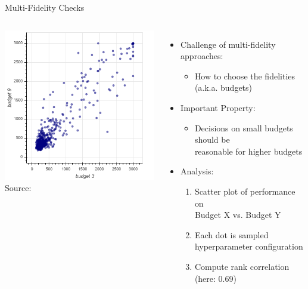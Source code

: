 \begin{frame}[c]{Multi-Fidelity Checks}

\begin{columns}
	
	\begin{center}
		\includegraphics[width=1.0\textwidth]{images/budget_scatter.png}\\
		Source: 
	\end{center}
	
	
	\begin{itemize}
		\item Challenge of multi-fidelity approaches:
		\begin{itemize}
			\item How to choose the fidelities (a.k.a. budgets)
		\end{itemize}
		\item Important Property:
		\begin{itemize}
			\item Decisions on small budgets should be\\
			 reasonable for higher budgets
		\end{itemize}
		\item Analysis:
		\begin{enumerate}
			\item Scatter plot of performance on\\
			 Budget X vs. Budget Y
			\item Each dot is sampled hyperparameter configuration
			\item Compute rank correlation (here: 0.69)
		\end{enumerate}
	\end{itemize}
	

\end{columns}
\end{frame}
